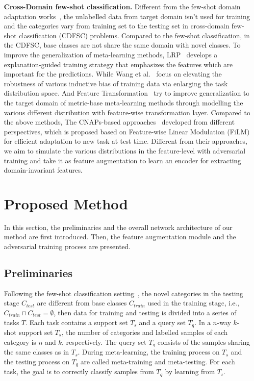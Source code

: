 \documentclass[runningheads]{utils/llncs}
\begin{document}
{\noindent \bf Cross-Domain few-shot classification.}
Different from the few-shot domain adaptation works~\cite{SaitoKSDS19,YueZZ0DKS21}, the unlabelled data from target domain isn't used for training and the categories vary from training set to the testing set in cross-domain few-shot classification (CDFSC) problems. Compared to the few-shot classification, in the CDFSC, base classes are not share the same domain with novel classes. To improve the generalization of meta-learning methods, LRP~\cite{SunLSZCB20} develops a explanation-guided training strategy that emphasizes the features which are important for the predictions. While Wang et al.~\cite{WangD21} focus on elevating the robustness of various inductive bias of training data via enlarging the task distribution space. And Feature Transformation~\cite{TsengLH020} try to improve generalization to the target domain of metric-base meta-learning methods through modelling the various different distribution with feature-wise transformation layer.
Compared to the above methods, The CNAPs-based approaches~\cite{Requeima0BNT19,BateniBMW22,Bronskill0RNT20,BronskillMPHNT21,BateniGMWS20} developed from different perspectives, which is proposed based on Feature-wise Linear Modulation (FiLM) for efficient adaptation to new task at test time. 
Different from their approaches, we aim to simulate the various distributions in the feature-level with adversarial training and take it as feature augmentation to learn an encoder for extracting domain-invariant features.

%
 \section{Proposed Method}
In this section, the preliminaries and the overall network architecture of our method are first introduced.
Then, the feature augmentation module and the adversarial training process are presented. 

\subsection{Preliminaries}
Following the few-shot classification setting~\cite{RaviL17}, the novel categories in the testing stage $C_{test}$ are different from base classes $C_{train}$ used in the training stage, i.e., $C_{train} \cap C_{test} = \emptyset$, then data for training and testing is divided into a series of tasks $T$. 
Each task contains a support set $T_s$ and a query set $T_q$. 
In a $n$-way $k$-shot support set $T_s$, the number of categories and labelled samples of each category is $n$ and $k$, respectively. 
The query set $T_q$ consists of the samples sharing the same classes as in $T_s$. 
During meta-learning, the training process on $T_s$ and the testing process on $T_q$ are called meta-training and meta-testing.
For each task, the goal is to correctly classify samples from $T_q$ by learning from $T_s$. 
\end{document}
